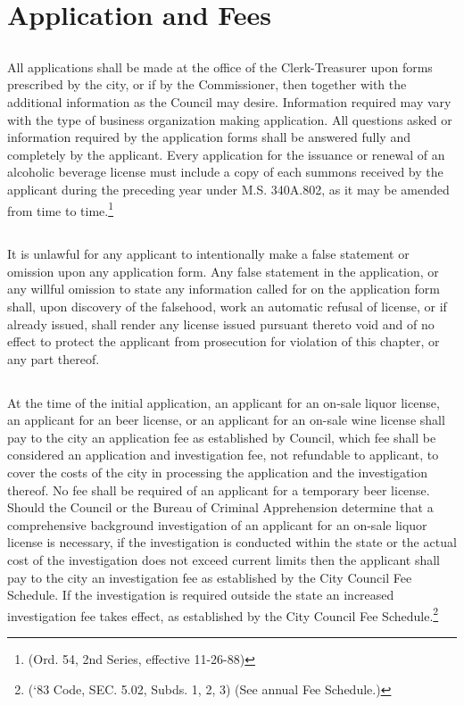 
\setcounter{section}{14}
\section{Application and Fees}
\subsection{}
All applications shall be made at the office of the Clerk-Treasurer upon forms prescribed by the city, or if by the Commissioner, then together with the additional information as the Council may desire. Information required may vary with the type of business organization making application. All questions asked or information required by the application forms shall be answered fully and completely by the applicant. Every application for the issuance or renewal of an alcoholic beverage license must include a copy of each summons received by the applicant during the preceding year under M.S. \textsection 340A.802, as it may be amended from time to time.\footnote{(Ord. 54, 2nd Series, effective 11-26-88)}
\subsection{}
It is unlawful for any applicant to intentionally make a false statement or omission upon any application form. Any false statement in the application, or any willful omission to state any information called for on the application form shall, upon discovery of the falsehood, work an automatic refusal of license, or if already issued, shall render any license issued pursuant thereto void and of no effect to protect the applicant from prosecution for violation of this chapter, or any part thereof.
\subsection{}
At the time of the initial application, an applicant for an on-sale liquor license, an applicant for an beer license, or an applicant for an on-sale wine license shall pay to the city an application fee as established by Council, which fee shall be considered an application and investigation fee, not refundable to applicant, to cover the costs of the city in processing the application and the investigation thereof. No fee shall be required of an applicant for a temporary beer license. Should the Council or the Bureau of Criminal Apprehension determine that a comprehensive background investigation of an applicant for an on-sale liquor license is necessary, if the investigation is conducted within the state or the actual cost of the investigation does not exceed current limits then the applicant shall pay to the city an investigation fee as established by the City Council Fee Schedule. If the investigation is required outside the state an increased investigation fee takes effect, as established by the City Council Fee Schedule.\footnote{(‘83 Code, SEC. 5.02, Subds. 1, 2, 3) (See annual Fee Schedule.)}

